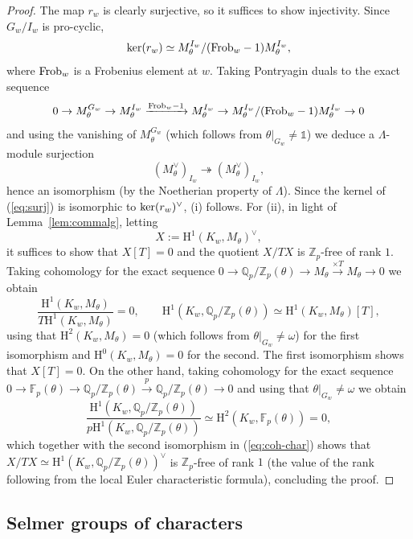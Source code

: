 \documentclass[10pt]{amsart}
\numberwithin{equation}{section}
\theoremstyle{definition}
\theoremstyle{remark}
\newcommand{\Z}{\mathbb{Z}}
\newcommand{\bZ}{\mathbb{Z}}
\newcommand{\bQ}{\mathbb{Q}}
\newcommand{\Q}{\mathbb{Q}}
\newcommand{\rH}{\mathrm{H}}
\begin{document}
\begin{proof} 
The map $r_w$ is clearly surjective, so it suffices to show injectivity. Since $G_w/I_w$ is pro-cyclic,
\[
{\rm ker}(r_w)\simeq M_\theta^{I_w}/({\rm Frob}_w-1)M_\theta^{I_w},
\]
where ${\rm Frob}_w$ is a Frobenius element at $w$. Taking Pontryagin duals to the exact sequence
\[
0\rightarrow M_\theta^{G_w}\rightarrow M_\theta^{I_w}\xrightarrow{{\rm Frob}_w-1}M_\theta^{I_w}\rightarrow M_\theta^{I_w}/({\rm Frob}_w-1)M_\theta^{I_w}\rightarrow 0
\]
and using the vanishing of $M_\theta^{G_w}$ (which follows from $\theta\vert_{G_w}\neq\mathds{1}$) we deduce a $\Lambda$-module surjection 
\begin{equation}\label{eq:surj}
(M_\theta^\vee)_{I_w}\twoheadrightarrow(M_\theta^\vee)_{I_w},
\end{equation}
hence an isomorphism (by the Noetherian property of $\Lambda$).
Since the kernel of (\ref{eq:surj}) is isomorphic to ${\rm ker}(r_w)^\vee$, (i)  follows. For (ii), in light of Lemma~\ref{lem:commalg}, letting 
\[
X:=\rH^1(K_w,M_\theta)^\vee,
\] 
it suffices to show that $X[T]=0$ and the quotient $X/TX$ is $\bZ_p$-free of rank $1$. Taking cohomology for the exact sequence $0\rightarrow\bQ_p/\bZ_p(\theta)\rightarrow M_{\theta}\xrightarrow{\times T}M_{\theta}\rightarrow 0$ we obtain 
\begin{equation}\label{eq:coh-char}
\frac{\rH^1(K_w,M_{\theta})}{T\rH^1(K_w,M_{\theta})}=0,\quad
\quad\rH^1(K_w,\Q_p/\Z_p(\theta))\simeq\rH^1(K_w,M_{\theta})[T],
\end{equation}
using that $\rH^2(K_w,M_\theta)=0$ (which follows from $\theta|_{G_w} \neq \omega$)
for the first isomorphism and 
$\rH^0(K_w,M_{\theta})=0$ for the second. The first isomorphism shows that $X[T]=0$. On the other hand, taking cohomology for the exact sequence $0\rightarrow\mathbb{F}_p(\theta)\rightarrow\bQ_p/\bZ_p(\theta)\xrightarrow{p}\bQ_p/\bZ_p(\theta)\rightarrow 0$ and using that $\theta\vert_{G_w}\neq\omega$ we obtain
\[
\frac{\rH^1(K_w,\bQ_p/\bZ_p(\theta))}{p\rH^1(K_w,\bQ_p/\bZ_p(\theta))}\simeq\rH^2(K_w,\mathbb{F}_p(\theta))=0,
\]
which together with the second isomorphism in (\ref{eq:coh-char}) shows that $X/TX\simeq\rH^1(K_w,\bQ_p/\bZ_p(\theta))^\vee$ is $\bZ_p$-free of rank $1$ (the value of the rank following from the local Euler characteristic formula), concluding the proof.
\end{proof}


\subsection{Selmer groups of characters}
\label{subsec:Sel-char}
\end{document}
